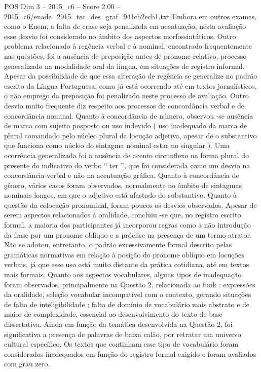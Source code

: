 \begin{textsample}{POS Dim 3 – 2015\_c6 – Score 2.00 – 2015\_c6/enade\_2015\_tec\_des\_graf\_941cb2ecb1.txt}
Embora em outros exames, como o Enem, a falta de crase seja penalizada em acentuação, nesta avaliação esse desvio foi considerado no âmbito dos aspectos morfossintáticos.
Outro problema relacionado à regência verbal e à nominal, encontrado frequentemente nas questões, foi a ausência de preposição antes de pronome relativo, processo generalizado na modalidade oral da língua, em situações de registro informal.
Apesar da possibilidade de que essa alteração de regência se generalize no padrão escrito da Língua Portuguesa, como já está ocorrendo até em textos jornalísticos, o não emprego da preposição foi penalizado neste processo de avaliação.
Outro desvio muito frequente diz respeito aos processos de concordância verbal e de concordância nominal.
Quanto à concordância de número, observou -se ausência de marca com sujeito posposto ou uso indevido ( uso inadequado da marca de plural comandado pelo núcleo plural da locução adjetiva, apesar de o substantivo que funciona como núcleo do sintagma nominal estar no singular ).
Uma ocorrência generalizada foi a ausência de acento circunflexo na forma plural do presente do indicativo do verbo “ ter ”, que foi considerada como um desvio na concordância verbal e não na acentuação gráfica.
Quanto à concordância de gênero, vários casos foram observados, normalmente no âmbito de sintagmas nominais longos, em que o adjetivo está afastado do substantivo.
Quanto à questão da colocação pronominal, foram poucos os desvios observados.
Apesar de serem aspectos relacionados à oralidade, concluiu -se que, no registro escrito formal, a maioria dos participantes já incorporou regras como a não introdução da frase por um pronome oblíquo e a próclise na presença de um termo atrator.
Não se adotou, entretanto, o padrão excessivamente formal descrito pelas gramáticas normativas em relação à posição do pronome oblíquo em locuções verbais, já que esse uso está muito distante da prática cotidiana, até em textos mais formais.
Quanto aos aspectos vocabulares, alguns tipos de inadequação foram observados, principalmente na Questão 2, relacionada ao funk : expressões da oralidade, seleção vocabular incompatível com o contexto, gerando situações de falta de inteligibilidade ; falta de domínio de vocabulário mais abstrato e de maior de complexidade, essencial ao desenvolvimento do texto de base dissertativa.
Ainda em função da temática desenvolvida na Questão 2, foi significativa a presença de palavras de baixa calão, por retratar um universo cultural específico.
Os textos que continham esse tipo de vocabulário foram considerados inadequados em função do registro formal exigido e foram avaliados com grau zero.

\end{textsample}
